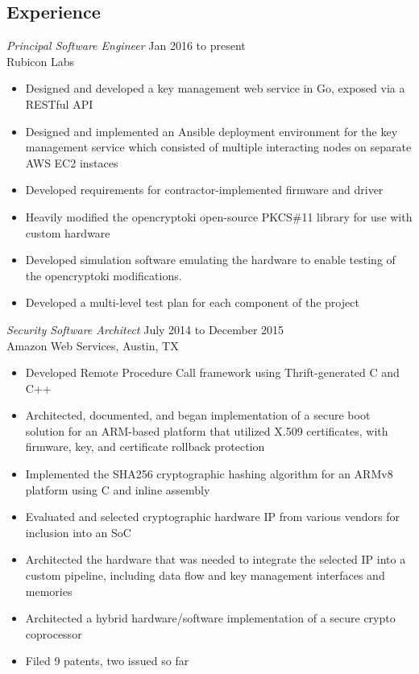 \documentclass[overlapped]{res}
\begin{document}
\begin{resume}
\section{Experience}
{\sl Principal Software Engineer} \hfill Jan 2016 to present \\
    Rubicon Labs
\begin{itemize}
    \item Designed and developed a key management web service in Go, exposed via a RESTful API
    \item Designed and implemented an Ansible deployment environment for the key
    management service which consisted of multiple interacting nodes on separate AWS
    EC2 instaces
    \item Developed requirements for contractor-implemented firmware and driver
    \item Heavily modified the opencryptoki open-source PKCS\#11 library for use with 
    custom hardware
    \item Developed simulation software emulating the hardware to enable testing of the
    opencryptoki modifications.
    \item Developed a multi-level test plan for each component of the project
\end{itemize}
{\sl Security Software Architect} \hfill July 2014 to December 2015 \\
	Amazon Web Services, Austin, TX
\begin{itemize}
    \item Developed Remote Procedure Call framework using Thrift-generated C and C++
	\item Architected, documented, and began implementation of a secure boot solution for an ARM-based platform that utilized X.509 certificates, with firmware, key, and certificate rollback protection
	\item Implemented the SHA256 cryptographic hashing algorithm for an ARMv8 platform using C and inline assembly
	\item Evaluated and selected cryptographic hardware IP from various vendors for inclusion into an SoC
	\item Architected the hardware that was needed to integrate the selected IP into a custom pipeline, including data flow and key management interfaces and memories
	\item Architected a hybrid hardware/software implementation of a secure crypto coprocessor
	\item Filed 9 patents, two issued so far
\end{itemize}

\end{resume}
\end{document}
